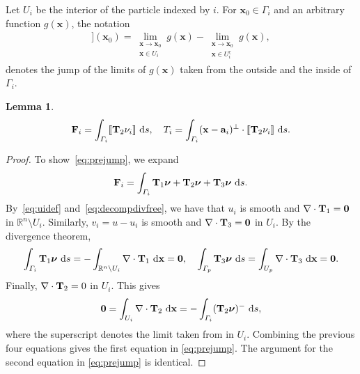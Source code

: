 \documentclass[lineno]{jfm}
\newtheorem{lemma}{Lemma}
\renewcommand{\aa}{\mathbf{a}}
\newcommand{\FF}{\mathbf{F}}
\newcommand{\nnu}{\boldsymbol{\nu}}
\newcommand{\xx}{\mathbf{x}}
\newcommand{\jump}[1]{[\![ #1 ]\!]}
\begin{document}
Let $U_i$ be the interior of the particle indexed by $i$. For $\xx_0
\in \Gamma_i$ and an arbitrary function $g(\xx)$, the notation
\begin{align}
  \jump{g}(\xx_0) = \lim_{\substack{\xx \to \xx_0 \\ \xx \in U_i}}g(\xx)  - 
                    \lim_{\substack{\xx \to \xx_0 \\ \xx \in U^c_i}}g(\xx),
\end{align}
denotes the jump of the limits of $g(\xx)$ taken from the outside and
the inside of $\Gamma_i$.
\begin{lemma}
\begin{align}
  \label{eq:prejump}
  \FF_i = \int_{\Gamma_i} \jump{{\bf T}_2  \nu_i}  \, \dif s,\quad
  T_i = \int_{\Gamma_i} (\xx - \aa_i)^{\perp} \cdot \jump{{\bf T}_2 \nu_i} \, \dif s.
\end{align}
\end{lemma}
\begin{proof}
To show~\eqref{eq:prejump}, we expand
\begin{align}
  \FF_i = \int_{\Gamma_i} {\bf T}_1\nnu + 
    {\bf T}_2\nnu + {\bf T}_3\nnu\,\dif s.
\end{align}
By~\eqref{eq:uidef} and~\eqref{eq:decompdivfree}, we have that $u_i$ is
smooth and $\nabla \cdot {\bf T}_1 = \mathbf{0}$ in $\mathbb{R}^n
\setminus U_i$. Similarly, $v_i = u - u_i$ is smooth and $\nabla \cdot
{\bf T}_3 = \mathbf{0}$ in $U_i$. By the divergence theorem,  
\begin{align}
  \int_{\Gamma_i}  {\bf T}_1\nnu \,\dif s
  = -\int_{\mathbb{R}^n \setminus U_i} \nabla \cdot {\bf T}_1 \,\dif \xx = \mathbf{0},\quad
    \int_{\Gamma_p}  {\bf T}_3 \nnu\,\dif s
  = \int_{U_p} \nabla \cdot {\bf T}_3 \,\dif \xx = \mathbf{0}.
\end{align}
Finally, $\nabla \cdot {\bf T}_2= 0$ in $U_i$. This gives
\begin{align}
  \mathbf{0} = \int_{U_i} \nabla \cdot {\bf T}_2 \, \dif \xx = -\int_{\Gamma_i}  
    ({\bf T}_2 \nnu)^-\,\dif s,
\end{align}
where the superscript denotes the limit taken from in $U_i$.  
Combining the previous four equations gives the first equation in \eqref{eq:prejump}.
The argument for the second equation in \eqref{eq:prejump} is identical. 
\end{proof}
\end{document}
